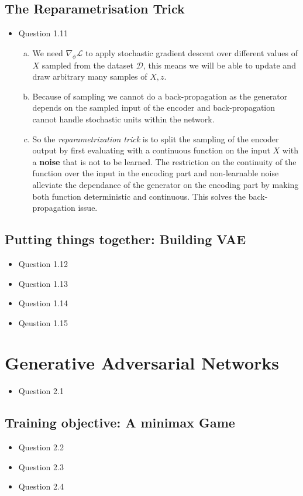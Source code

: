 \documentclass{article}
\begin{document}
  \subsection{The Reparametrisation Trick}
    \begin{itemize}
      \item Question 1.11
      \begin{enumerate}[(a)]
        \item We need $\nabla_{\phi} \mathcal{L}$ to apply stochastic gradient descent over different values of $X$ sampled from the dataset $\mathcal{D}$, this means we will be able to update and draw arbitrary many samples of $X, z$. 
        \item Because of sampling we cannot do a back-propagation as the generator depends on the sampled input of the encoder and back-propagation cannot handle stochastic units within the network. 
        \item So the \textit{reparametrization trick} is to split the sampling of the encoder output by first evaluating with a continuous function on the input $X$ with a \textbf{noise} that is not to be learned. The restriction on the continuity of the function over the input in the encoding part and non-learnable noise alleviate the dependance of the generator on the encoding part by making both function deterministic and continuous. This solves the back-propagation issue. 
      \end{enumerate}
    \end{itemize}
  \subsection{Putting things together: Building VAE}
    \begin{itemize}
      \item Question 1.12
      \item Question 1.13
      \item Question 1.14
      \item Qeustion 1.15
    \end{itemize}
\section{Generative Adversarial Networks}
    \begin{itemize}
      \item Question 2.1
    \end{itemize}
    \subsection{Training objective: A minimax Game}
      \begin{itemize}
        \item Question 2.2
        \item Question 2.3
        \item Question 2.4
      \end{itemize}
\end{document}
